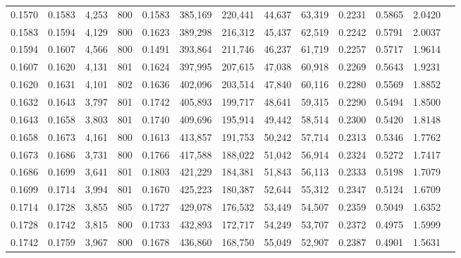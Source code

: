 \begin{tabular}{rrrrrrrrrrrrr}
0.1570 & 0.1583 &  4,253 & 800 &                                     0.1583 & 385,169 & 220,441 &  44,637 &  63,319 & 0.2231 & 0.5865 & 2.0420 \\
0.1583 & 0.1594 &  4,129 & 800 &                                     0.1623 & 389,298 & 216,312 &  45,437 &  62,519 & 0.2242 & 0.5791 & 2.0037 \\
0.1594 & 0.1607 &  4,566 & 800 &                                     0.1491 & 393,864 & 211,746 &  46,237 &  61,719 & 0.2257 & 0.5717 & 1.9614 \\
0.1607 & 0.1620 &  4,131 & 801 &                                     0.1624 & 397,995 & 207,615 &  47,038 &  60,918 & 0.2269 & 0.5643 & 1.9231 \\
0.1620 & 0.1631 &  4,101 & 802 &                                     0.1636 & 402,096 & 203,514 &  47,840 &  60,116 & 0.2280 & 0.5569 & 1.8852 \\
0.1632 & 0.1643 &  3,797 & 801 &                                     0.1742 & 405,893 & 199,717 &  48,641 &  59,315 & 0.2290 & 0.5494 & 1.8500 \\
0.1643 & 0.1658 &  3,803 & 801 &                                     0.1740 & 409,696 & 195,914 &  49,442 &  58,514 & 0.2300 & 0.5420 & 1.8148 \\
0.1658 & 0.1673 &  4,161 & 800 &                                     0.1613 & 413,857 & 191,753 &  50,242 &  57,714 & 0.2313 & 0.5346 & 1.7762 \\
0.1673 & 0.1686 &  3,731 & 800 &                                     0.1766 & 417,588 & 188,022 &  51,042 &  56,914 & 0.2324 & 0.5272 & 1.7417 \\
0.1686 & 0.1699 &  3,641 & 801 &                                     0.1803 & 421,229 & 184,381 &  51,843 &  56,113 & 0.2333 & 0.5198 & 1.7079 \\
0.1699 & 0.1714 &  3,994 & 801 &                                     0.1670 & 425,223 & 180,387 &  52,644 &  55,312 & 0.2347 & 0.5124 & 1.6709 \\
0.1714 & 0.1728 &  3,855 & 805 &                                     0.1727 & 429,078 & 176,532 &  53,449 &  54,507 & 0.2359 & 0.5049 & 1.6352 \\
0.1728 & 0.1742 &  3,815 & 800 &                                     0.1733 & 432,893 & 172,717 &  54,249 &  53,707 & 0.2372 & 0.4975 & 1.5999 \\
0.1742 & 0.1759 &  3,967 & 800 &                                     0.1678 & 436,860 & 168,750 &  55,049 &  52,907 & 0.2387 & 0.4901 & 1.5631 \\

\end{tabular}
